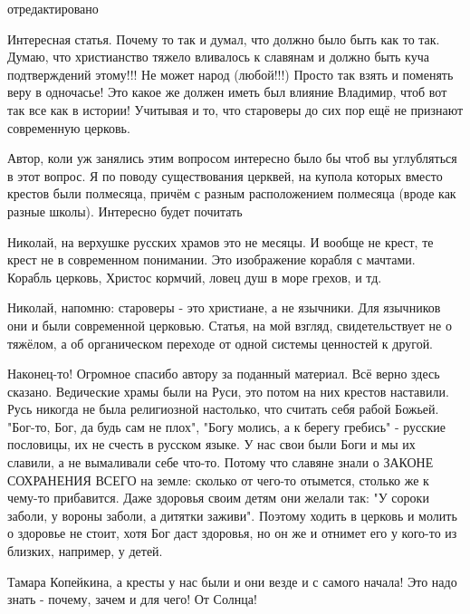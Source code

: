 \begin{itemize}
отредактировано

Интересная статья. Почему то так и думал, что должно было быть как то так.
Думаю, что христианство тяжело вливалось к славянам и должно быть куча
подтверждений этому!!! Не может народ (любой!!!) Просто так взять и поменять
веру в одночасье! Это какое же должен иметь был влияние Владимир, чтоб вот так
все как в истории! Учитывая и то, что староверы до сих пор ещё не признают
современную церковь.

Автор, коли уж занялись этим вопросом интересно было бы чтоб вы углубляться в
этот вопрос. Я по поводу существования церквей, на купола которых вместо
крестов были полмесяца, причём с разным расположением полмесяца (вроде как
разные школы). Интересно будет почитать


Николай, на верхушке русских храмов это не месяцы. И вообще не крест, те крест
не в современном понимании. Это изображение корабля с мачтами. Корабль церковь,
Христос кормчий, ловец душ в море грехов, и тд.


Николай, напомню: староверы - это христиане, а не язычники. Для язычников они и
были современной церковью. Статья, на мой взгляд, свидетельствует не о тяжёлом,
а об органическом переходе от одной системы ценностей к другой.


Наконец-то! Огромное спасибо автору за поданный материал. Всё верно здесь
сказано. Ведические храмы были на Руси, это потом на них крестов наставили.
Русь никогда не была религиозной настолько, что считать себя рабой Божьей.
"Бог-то, Бог, да будь сам не плох", "Богу молись, а к берегу гребись" - русские
пословицы, их не счесть в русском языке. У нас свои были Боги и мы их славили,
а не вымаливали себе что-то. Потому что славяне знали о ЗАКОНЕ СОХРАНЕНИЯ ВСЕГО
на земле: сколько от чего-то отымется, столько же к чему-то прибавится. Даже
здоровья своим детям они желали так: "У сороки заболи, у вороны заболи, а
дитятки заживи". Поэтому ходить в церковь и молить о здоровье не стоит, хотя
Бог даст здоровья, но он же и отнимет его у кого-то из близких, например, у
детей.


Тамара Копейкина, а кресты у нас были и они везде и с самого начала! Это надо
знать - почему, зачем и для чего! От Солнца!



\end{itemize}
